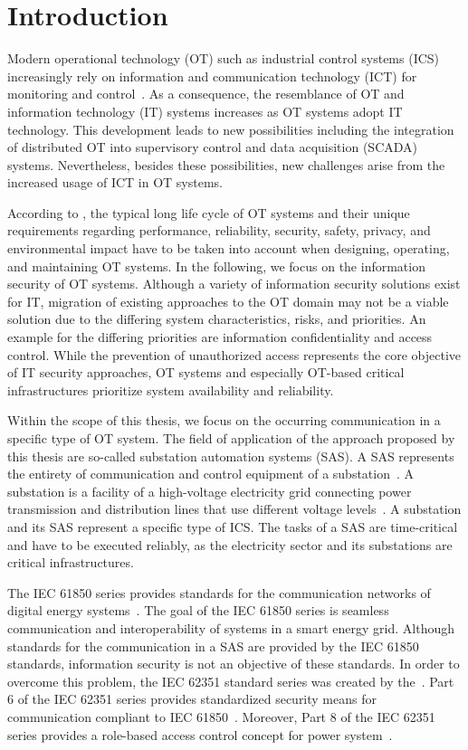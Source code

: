 \chapter{Introduction}
\label{ch:introduction}
Modern operational technology (OT) such as industrial control systems (ICS) increasingly rely on information and communication technology (ICT) for monitoring and control~\cite{Stouffer2023}.
As a consequence, the resemblance of OT and information technology (IT) systems increases as OT systems adopt IT technology.
This development leads to new possibilities including the integration of distributed OT into supervisory control and data acquisition (SCADA) systems.
Nevertheless, besides these possibilities, new challenges arise from the increased usage of ICT in OT systems.

According to \citeauthor{Stouffer2023} \cite{Stouffer2023}, the typical long life cycle of OT systems and their unique requirements regarding performance, reliability, security, safety, privacy, and environmental impact have to be taken into account when designing, operating, and maintaining OT systems.
In the following, we focus on the information security of OT systems.
Although a variety of information security solutions exist for IT, migration of existing approaches to the OT domain may not be a viable solution due to the differing system characteristics, risks, and priorities.
An example for the differing priorities are information confidentiality and access control.
While the prevention of unauthorized access represents the core objective of IT security approaches, OT systems and especially OT-based critical infrastructures prioritize system availability and reliability.

Within the scope of this thesis, we focus on the occurring communication in a specific type of OT system.
The field of application of the approach proposed by this thesis are so-called substation automation systems (SAS).
A SAS represents the entirety of communication and control equipment of a substation~\cite{Padilla2015}.
A substation is a facility of a high-voltage electricity grid connecting power transmission and distribution lines that use different voltage levels~\cite{oshaSubstation}.
A substation and its SAS represent a specific type of ICS.
The tasks of a SAS are time-critical and have to be executed reliably, as the electricity sector and its substations are critical infrastructures.

The IEC 61850 series provides standards for the communication networks of digital energy systems~\cite{IEC61850P5}.
The goal of the IEC 61850 series is seamless communication and interoperability of systems in a smart energy grid.
Although standards for the communication in a SAS are provided by the IEC 61850 standards, information security is not an objective of these standards.
In order to overcome this problem, the IEC 62351 standard series was created by the~\citeauthor{IEC62351P6}.
Part 6 of the IEC 62351 series provides standardized security means for communication compliant to IEC 61850~\cite{IEC62351P6}.
Moreover, Part 8 of the IEC 62351 series provides a role-based access control concept for power system~\cite{IEC62351P8}.

